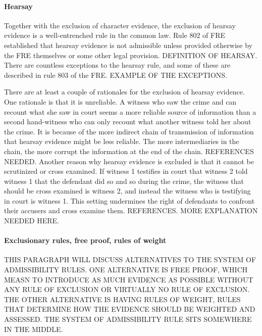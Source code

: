 \documentclass[10pt]{article}
\begin{document}
\paragraph{Hearsay} Together with the exclusion of character evidence, the exclusion of hearsay evidence is a well-entrenched rule in the common law. Rule 802 of FRE established that hearsay evidence is 
not admissible unless provided otherwise by the FRE themselves or some other legal provision. DEFINITION OF HEARSAY. There are countless exceptions to the hearsay rule, and some of these are described in rule 803 of the FRE. EXAMPLE OF THE EXCEPTIONS. 

There are at least a couple of rationales for the exclusion of hearsay evidence. One rationale is that it is unreliable. A witness who saw the crime and can recount what she saw in court seems a more reliable source of information than a second hand-witness who can only recount what another witness told her about the crime. It is because of the more indirect chain of transmission of information that hearsay evidence might be less reliable. The more intermediaries in the chain, the more corrupt the information at the end of the chain. REFERENCES NEEDED.  Another reason why hearsay evidence is excluded is that it cannot be  scrutinized or cross examined. If witness 1 testifies in court that witness 2 told witness 1 that the defendant did so and so during the crime, the witness that should be cross examined is witness 2, and instead the witness who is testifying in court is witness 1. This setting undermines the right of defendants to confront their accusers and cross examine them. REFERENCES. MORE EXPLANATION NEEDED HERE. 









\paragraph{Exclusionary rules, free proof, rules of weight}

THIS PARAGRAPH WILL DISCUSS ALTERNATIVES TO THE SYSTEM OF ADMISSIBILITY RULES. ONE ALTERNATIVE IS FREE PROOF, WHICH MEASN TO INTRODUCE AS MUCH EVIDENCE AS POSSIBLE WITHOUT ANY RULE OF EXCLUSION OR VIRTUALLY NO RULE OF EXCLUSION. THE OTHER ALTERNATIVE IS HAVING RULES OF WEIGHT, RULES THAT DETERMINE HOW THE EVIDENCE SHOULD BE WEIGHTED AND ASSESSED. THE SYSTEM OF ADMISSIBILITY RULE SITS SOMEWHERE IN THE MIDDLE.
\end{document}
